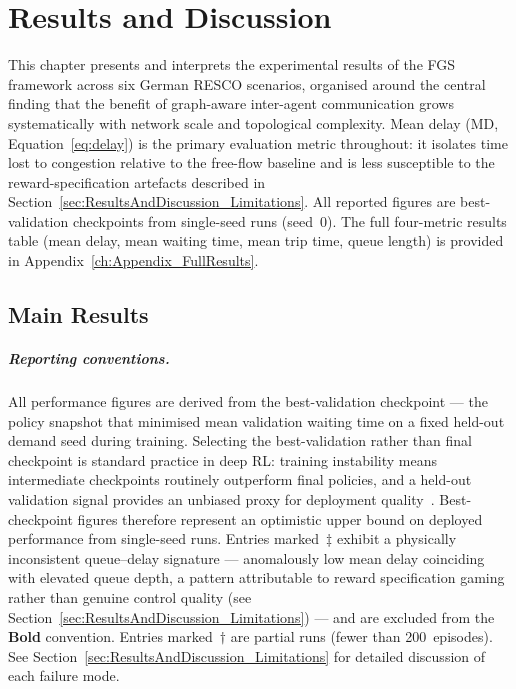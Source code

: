 \chapter{Results and Discussion}
\label{ch:ResultsAndDiscussion}

This chapter presents and interprets the experimental results of the FGS framework across six German RESCO scenarios, organised around the central finding that the benefit of graph-aware inter-agent communication grows systematically with network scale and topological complexity. Mean delay (MD, Equation~\ref{eq:delay}) is the primary evaluation metric throughout: it isolates time lost to congestion relative to the free-flow baseline and is less susceptible to the reward-specification artefacts described in Section~\ref{sec:ResultsAndDiscussion_Limitations}. All reported figures are best-validation checkpoints from single-seed runs (seed~0). The full four-metric results table (mean delay, mean waiting time, mean trip time, queue length) is provided in Appendix~\ref{ch:Appendix_FullResults}.

\section{Main Results}
\label{sec:ResultsAndDiscussion_MainResults}

\paragraph{Reporting conventions.}
All performance figures are derived from the best-validation checkpoint --- the policy snapshot that minimised mean validation waiting time on a fixed held-out demand seed during training. Selecting the best-validation rather than final checkpoint is standard practice in deep RL: training instability means intermediate checkpoints routinely outperform final policies, and a held-out validation signal provides an unbiased proxy for deployment quality~\citep{henderson2018deep}. Best-checkpoint figures therefore represent an optimistic upper bound on deployed performance from single-seed runs. Entries marked~$\ddagger$ exhibit a physically inconsistent queue--delay signature --- anomalously low mean delay coinciding with elevated queue depth, a pattern attributable to reward specification gaming rather than genuine control quality (see Section~\ref{sec:ResultsAndDiscussion_Limitations}) --- and are excluded from the \textbf{Bold} convention. Entries marked~$\dagger$ are partial runs (fewer than 200~episodes). See Section~\ref{sec:ResultsAndDiscussion_Limitations} for detailed discussion of each failure mode.

